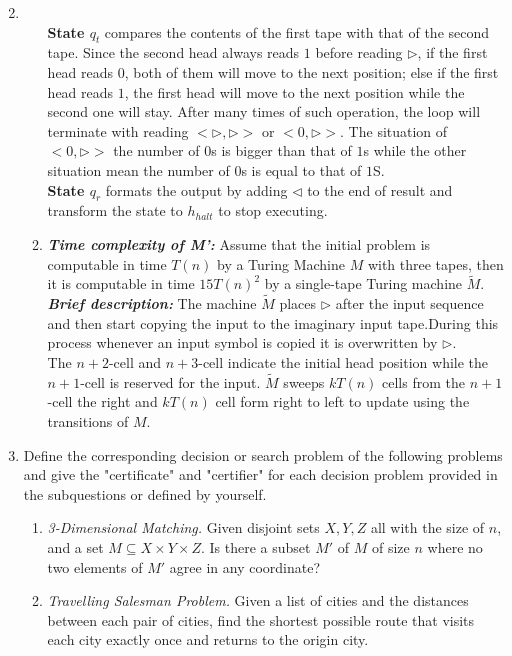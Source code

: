 \documentclass[12pt,a4paper]{article}
\makeatletter
\newtheorem*{solution}{Solution}
\theoremstyle{definition}
\renewenvironment{solution}[1][Solution] {\par\pushQED{\qed}\normalfont\topsep6\p@\@plus6\p@\relax\trivlist\item[\hskip\labelsep\bfseries#1\@addpunct{.}]\ignorespaces}{\popQED\endtrivlist\@endpefalse} \makeatother
\makeatother
\begin{document}
\begin{enumerate}
\begin{solution}
\begin{enumerate}
	\\
	\textbf{State $q_t$} compares the contents of the first tape with that of the second tape. Since the second head always reads $1$ before reading $\triangleright$, if the first head reads $0$, both of them will move to the next position; else if the first head reads $1$, the first head will move to the next position while the second one will stay. After many times of such operation, the loop will terminate with reading $<\triangleright,\triangleright>$ or $<0,\triangleright>$. The situation of $<0,\triangleright>$ the number of $0$s is bigger than that of $1$s while the other situation mean the number of $0$s is equal to that of $1$S.
	\\
	\textbf{State $q_r$} formats the output by adding $\triangleleft$ to the end of result and transform the state to $h_{halt}$ to stop executing. 
	
	\item 
	\textbf{\textit{Time complexity of M':}} Assume that the initial problem is computable in time $T(n)$ by a Turing Machine $M$ with three tapes, then it is computable in time $15T(n)^2$ by a single-tape Turing machine $\tilde{M}$.
	\\
	\textbf{\textit{Brief description:}} The machine $\tilde{M}$ places $\triangleright$ after the input sequence and then start copying the input to the imaginary input tape.During this process whenever an input symbol is copied it is overwritten by $\triangleright$.
	\\
	The $n+2$-cell and $n+3$-cell indicate the initial head position while the $n+1$-cell is reserved for the input. $\tilde{M}$ sweeps $kT(n)$ cells from the $n+1$-cell the right and $kT(n)$ cell form right to left to update using the transitions of $M$.
	\end{enumerate}
	\end{solution}
	\item Define the corresponding decision or search problem of the following problems and give the "certificate" and "certifier" for each decision problem provided in the subquestions or defined by yourself.
	
	\begin{enumerate}
	    \item
	    \textit{3-Dimensional Matching.}  Given disjoint sets $X,Y,Z$ all with the size of $n$, and a set $M \subseteq X\times Y\times Z$.  Is there a subset $M'$ of $M$ of size $n$ where no two elements of $M'$ agree in any coordinate?
	    
	    \item 
	    \textit{Travelling Salesman Problem.} Given a list of cities and the distances between each pair of cities, find the shortest possible route that visits each city exactly once and returns to the origin city.
	    

\end{enumerate}
\end{enumerate}
\end{document}

